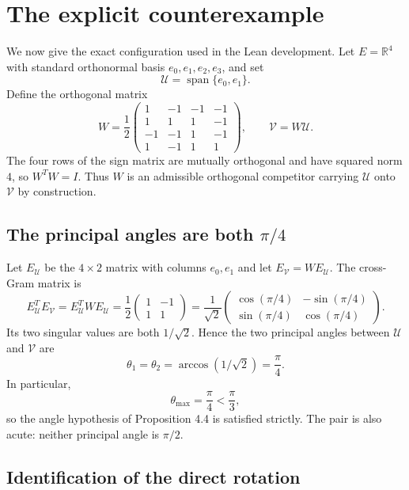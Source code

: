 \documentclass[11pt]{article}
\theoremstyle{definition}
\newcommand{\R}{\mathbb R}
\newcommand{\spanof}{\operatorname{span}}
\begin{document}
\section{The explicit counterexample}
\label{sec:counterexample}

We now give the exact configuration used in the Lean development.  Let
$E=\R^4$ with standard orthonormal basis $e_0,e_1,e_2,e_3$, and set
\[
 \mathcal U=\spanof\{e_0,e_1\}.
\]
Define the orthogonal matrix
\begin{equation}
\label{eq:W}
 W=\frac12
 \begin{pmatrix}
  1&-1&-1&-1\\
  1& 1& 1&-1\\
 -1&-1& 1&-1\\
  1&-1& 1& 1
 \end{pmatrix},
 \qquad
 \mathcal V=W\mathcal U.
\end{equation}
The four rows of the sign matrix are mutually orthogonal and have squared norm
$4$, so $W^TW=I$.  Thus $W$ is an admissible orthogonal competitor carrying
$\mathcal U$ onto $\mathcal V$ by construction.

\subsection{The principal angles are both $\pi/4$}

Let $E_{\mathcal U}$ be the $4\times2$ matrix with columns $e_0,e_1$ and let
$E_{\mathcal V}=WE_{\mathcal U}$.  The cross-Gram matrix is
\[
 E_{\mathcal U}^T E_{\mathcal V}
 =E_{\mathcal U}^TWE_{\mathcal U}
 =\frac12
 \begin{pmatrix}
  1&-1\\
  1& 1
 \end{pmatrix}
 =\frac1{\sqrt2}
 \begin{pmatrix}
  \cos(\pi/4)&-\sin(\pi/4)\\
  \sin(\pi/4)& \cos(\pi/4)
 \end{pmatrix}.
\]
Its two singular values are both $1/\sqrt2$.  Hence the two principal angles
between $\mathcal U$ and $\mathcal V$ are
\[
 \theta_1=\theta_2=\arccos(1/\sqrt2)=\frac\pi4.
\]
In particular,
\[
 \theta_{\max}=\frac\pi4<\frac\pi3,
\]
so the angle hypothesis of Proposition 4.4 is satisfied strictly.  The pair is
also acute: neither principal angle is $\pi/2$.

\subsection{Identification of the direct rotation}
\end{document}
